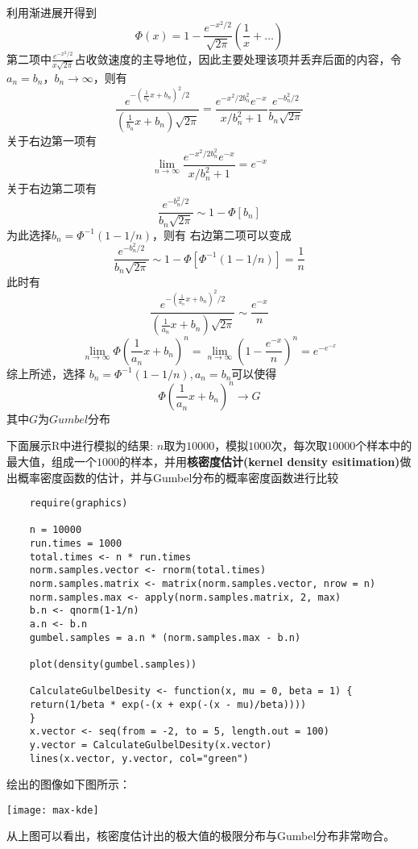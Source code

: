 \documentclass[UTF8]{article}
\begin{document}
	利用渐进展开得到$$\Phi(x) = 1-\frac{e^{-x^2/2}}{\sqrt{2\pi}}\left(\frac{1}{x}+ \ldots\right)$$
	第二项中$\frac{e^{-x^2/2}}{x\sqrt{2\pi}}$占收敛速度的主导地位，因此主要处理该项并丢弃后面的内容，令$a_n=b_n$，$b_n\rightarrow \infty$，则有$$\frac{e^{-(\frac1{b_n}x+b_n)^2/2}}{(\frac1{b_n}x+b_n)\sqrt{2\pi}} = \frac{e^{-x^2/2b_n^2}e^{-x}}{x/b_n^2+1}\frac{e^{-b_n^2/2}}{b_n\sqrt{2\pi}}$$
	关于右边第一项有
	$$\lim_{n \rightarrow \infty} \frac{e^{-x^2/2b_n^2}e^{-x}}{x/b_n^2+1}=e^{-x}$$
	关于右边第二项有
	$$\frac{e^{-b_n^2/2}}{b_n\sqrt{2\pi}} \sim 1-\Phi[b_n]$$
	为此选择$b_n=\Phi^{-1}(1-1/n)$，则有
	右边第二项可以变成
	$$\frac{e^{-b_n^2/2}}{b_n\sqrt{2\pi}} \sim 1-\Phi[\Phi^{-1}(1-1/n)]= \frac1{n}$$
	此时有
	$$\frac{e^{-(\frac1{a_n} x + b_n)^2/2}}{(\frac1{a_n} x +b_n)\sqrt{2\pi}}\sim \frac{e^{-x}}{n}$$
	$$\lim_{n \rightarrow \infty}\Phi(\frac1{a_n}x+b_n)^n =\lim_{n \rightarrow \infty}\left(1-\frac{e^{-x}}{n}\right)^n= e^{-e^{-x}}$$
	综上所述，选择
	$b_n=\Phi^{-1}(1-1/n), a_n=b_n$可以使得
	$$\Phi(\frac1{a_n}x+b_n)^n\rightarrow G$$其中$G$为$Gumbel$分布
	
	下面展示R中进行模拟的结果:
	$n$取为$10000$，模拟$1000$次，每次取$10000$个样本中的最大值，组成一个$1000$的样本，并用\textbf{核密度估计(kernel density esitimation)}做出概率密度函数的估计，并与Gumbel分布的概率密度函数进行比较
	
	\begin{lstlisting}
	require(graphics)
	
	n = 10000
	run.times = 1000
	total.times <- n * run.times
	norm.samples.vector <- rnorm(total.times)
	norm.samples.matrix <- matrix(norm.samples.vector, nrow = n)
	norm.samples.max <- apply(norm.samples.matrix, 2, max)
	b.n <- qnorm(1-1/n)
	a.n <- b.n
	gumbel.samples = a.n * (norm.samples.max - b.n)
	
	plot(density(gumbel.samples))
	
	CalculateGulbelDesity <- function(x, mu = 0, beta = 1) {
	return(1/beta * exp(-(x + exp(-(x - mu)/beta))))
	}
	x.vector <- seq(from = -2, to = 5, length.out = 100)
	y.vector = CalculateGulbelDesity(x.vector)
	lines(x.vector, y.vector, col="green")
	\end{lstlisting}
	
	绘出的图像如下图所示：
	
	\texttt{[image: max-kde]}
	
	从上图可以看出，核密度估计出的极大值的极限分布与Gumbel分布非常吻合。
	
\end{document}
